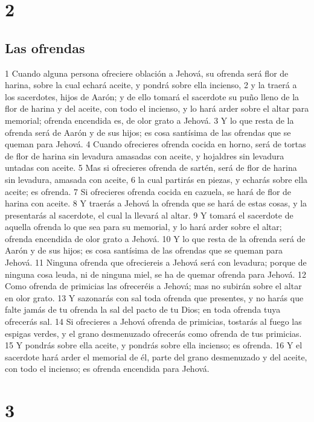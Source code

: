 \chapter{2}

\section{Las ofrendas}

1 Cuando alguna persona ofreciere oblación a Jehová, su ofrenda será flor de harina, sobre la cual echará aceite, y pondrá sobre ella incienso,
2 y la traerá a los sacerdotes, hijos de Aarón; y de ello tomará el sacerdote su puño lleno de la flor de harina y del aceite, con todo el incienso, y lo hará arder sobre el altar para memorial; ofrenda encendida es, de olor grato a Jehová.
3 Y lo que resta de la ofrenda será de Aarón y de sus hijos; es cosa santísima de las ofrendas que se queman para Jehová.
4 Cuando ofrecieres ofrenda cocida en horno, será de tortas de flor de harina sin levadura amasadas con aceite, y hojaldres sin levadura untadas con aceite.
5 Mas si ofrecieres ofrenda de sartén, será de flor de harina sin levadura, amasada con aceite,
6 la cual partirás en piezas, y echarás sobre ella aceite; es ofrenda.
7 Si ofrecieres ofrenda cocida en cazuela, se hará de flor de harina con aceite.
8 Y traerás a Jehová la ofrenda que se hará de estas cosas, y la presentarás al sacerdote, el cual la llevará al altar.
9 Y tomará el sacerdote de aquella ofrenda lo que sea para su memorial, y lo hará arder sobre el altar; ofrenda encendida de olor grato a Jehová.
10 Y lo que resta de la ofrenda será de Aarón y de sus hijos; es cosa santísima de las ofrendas que se queman para Jehová.
11 Ninguna ofrenda que ofreciereis a Jehová será con levadura; porque de ninguna cosa leuda, ni de ninguna miel, se ha de quemar ofrenda para Jehová.
12 Como ofrenda de primicias las ofreceréis a Jehová; mas no subirán sobre el altar en olor grato.
13 Y sazonarás con sal toda ofrenda que presentes, y no harás que falte jamás de tu ofrenda la sal del pacto de tu Dios; en toda ofrenda tuya ofrecerás sal.
14 Si ofrecieres a Jehová ofrenda de primicias, tostarás al fuego las espigas verdes, y el grano desmenuzado ofrecerás como ofrenda de tus primicias.
15 Y pondrás sobre ella aceite, y pondrás sobre ella incienso; es ofrenda.
16 Y el sacerdote hará arder el memorial de él, parte del grano desmenuzado y del aceite, con todo el incienso; es ofrenda encendida para Jehová.  

\chapter{3}

